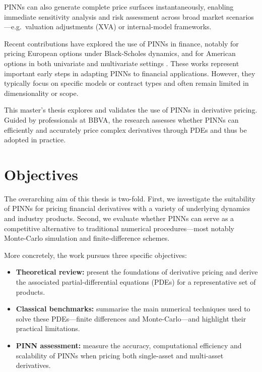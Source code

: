 \documentclass[12pt]{report} %
\theoremstyle{plain} %
\theoremstyle{definition} %
\theoremstyle{remark} %
\begin{document}
PINNs can also generate complete price surfaces instantaneously, enabling immediate sensitivity
analysis and risk assessment across broad market scenarios—e.g.\ valuation adjustments (XVA)
or internal-model frameworks.

Recent contributions have explored the use of PINNs in finance, 
notably for pricing European options under Black-Scholes dynamics, 
and for American options in both univariate and multivariate settings 
\cite{GATTA202368, math9010046}. These works represent important 
early steps in adapting PINNs to financial applications. However, they typically 
focus on specific models or contract types and often remain limited in dimensionality or scope.

This master's thesis explores and validates the use of PINNs in derivative pricing.
Guided by professionals at BBVA, the research assesses whether PINNs can efficiently
and accurately price complex derivatives through PDEs and thus be adopted in practice.


\section{Objectives}

The overarching aim of this thesis is two-fold. 
First, we investigate the suitability of PINNs for pricing
financial derivatives with a variety of underlying dynamics and industry products.
Second, we evaluate whether PINNs can serve as a competitive alternative to traditional
numerical procedures—most notably Monte-Carlo simulation and finite-difference schemes.

More concretely, the work pursues three specific objectives:
\begin{itemize}
 \item \textbf{Theoretical review:} present the foundations of derivative pricing and derive the
 associated partial-differential equations (PDEs) for a representative set of products.
 \item \textbf{Classical benchmarks:} summarise the main numerical techniques used to solve
 these PDEs—finite differences and Monte-Carlo—and highlight their
 practical limitations.
 \item \textbf{PINN assessment:} measure the accuracy, computational efficiency and scalability
 of PINNs when pricing both single-asset and multi-asset derivatives.
\end{itemize}
\end{document}

